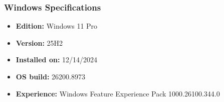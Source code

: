 \documentclass[
]{report}
\providecommand{\tightlist}{%
  \setlength{\itemsep}{0pt}\setlength{\parskip}{0pt}}
\begin{document}
\subsubsection{Windows Specifications}\label{windows-specifications}

\begin{itemize}
\tightlist
\item
  \textbf{Edition:} Windows 11 Pro
\item
  \textbf{Version:} 25H2
\item
  \textbf{Installed on:} 12/14/2024
\item
  \textbf{OS build:} 26200.8973
\item
  \textbf{Experience:} Windows Feature Experience Pack 1000.26100.344.0
\end{itemize}

\printbibliography
\end{document}
